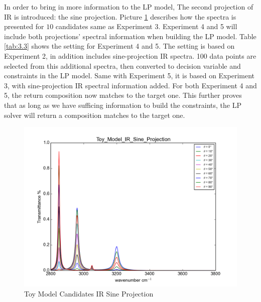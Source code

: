 
In order to bring in more information to the LP model, The second projection of IR is introduced: the sine projection. Picture \ref{fig:3.4} describes how the spectra is presented for $10$ candidates same as Experiment 3. Experiment 4 and 5 will include both projections' spectral information when building the LP model. Table \ref{tab:3.3} shows the setting for Experiment 4 and 5. The setting is based on Experiment 2, in addition includes sine-projection IR spectra. 100 data points are selected from this additional spectra, then converted to decision variable and constraints in the LP model. Same with Experiment 5, it is based on Experiment 3, with sine-projection IR spectral information added. For both Experiment 4 and 5, the return composition now matches to the target one. This further proves that as long as we have sufficing information to build the constraints, the LP solver will return a composition matches to the target one. \\ 

\begin{figure}[!ht] \label{fig:3.4}
\centering
\includegraphics[scale=0.7]{Figures/Toy_Model_IR_Sine_Projection.png} 
\caption{Toy Model Candidates IR Sine Projection} 
\end{figure}

